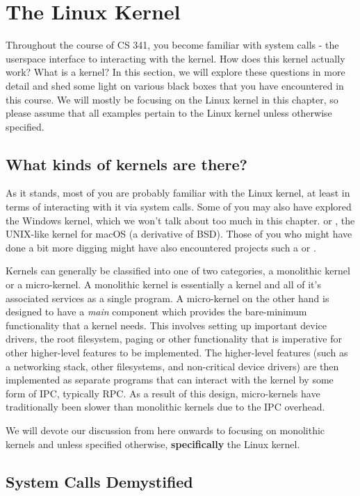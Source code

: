 \section{The Linux Kernel}

Throughout the course of CS 341, you become familiar with system calls - the userspace interface to interacting with the kernel.
How does this kernel actually work? What is a kernel?
In this section, we will explore these questions in more detail and shed some light on various black boxes that you have encountered in this course.
We will mostly be focusing on the Linux kernel in this chapter, so please assume that all examples pertain to the Linux kernel unless otherwise specified.

\subsection{What kinds of kernels are there?}

As it stands, most of you are probably familiar with the Linux kernel, at least in terms of interacting with it via system calls.
Some of you may also have explored the Windows kernel, which we won't talk about too much in this chapter.
or , the UNIX-like kernel for macOS (a derivative of BSD).
Those of you who might have done a bit more digging might have also encountered projects such a  or .

Kernels can generally be classified into one of two categories, a monolithic kernel or a micro-kernel. A monolithic
kernel is essentially a kernel and all of it's associated services as a single program. A micro-kernel on the other hand
is designed to have a \textit{main} component which provides the bare-minimum functionality that a kernel needs. This
involves setting up important device drivers, the root filesystem, paging or other functionality that is imperative for
other higher-level features to be implemented. The higher-level features (such as a networking stack, other filesystems,
and non-critical device drivers) are then implemented as separate programs that can interact with the kernel by some
form of IPC, typically RPC. As a result of this design, micro-kernels have traditionally been slower than monolithic
kernels due to the IPC overhead.

We will devote our discussion from here onwards to focusing on monolithic kernels and unless specified otherwise,
\textbf{specifically} the Linux kernel.

\subsection{System Calls Demystified}

